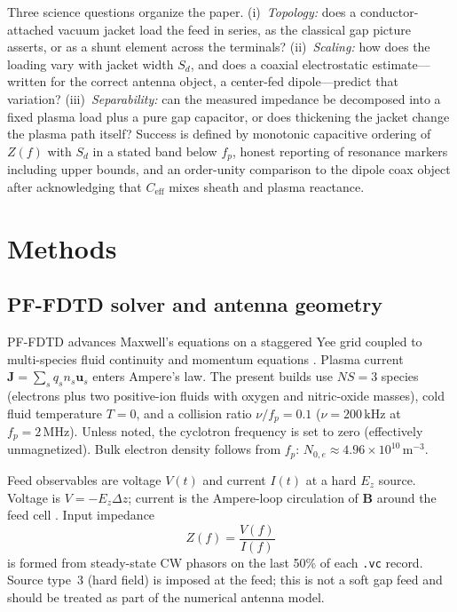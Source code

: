 \documentclass[draft]{agujournal2025}
\begin{document}
Three science questions organize the paper. (i)~\emph{Topology:} does a conductor-attached vacuum jacket load the feed in series, as the classical gap picture asserts, or as a shunt element across the terminals? (ii)~\emph{Scaling:} how does the loading vary with jacket width \(S_d\), and does a coaxial electrostatic estimate---written for the correct antenna object, a center-fed dipole---predict that variation? (iii)~\emph{Separability:} can the measured impedance be decomposed into a fixed plasma load plus a pure gap capacitor, or does thickening the jacket change the plasma path itself? Success is defined by monotonic capacitive ordering of \(Z(f)\) with \(S_d\) in a stated band below \(f_p\), honest reporting of resonance markers including upper bounds, and an order-unity comparison to the dipole coax object after acknowledging that \(C_\mathrm{eff}\) mixes sheath and plasma reactance.

\section{Methods}

\subsection{PF-FDTD solver and antenna geometry}

PF-FDTD advances Maxwell's equations on a staggered Yee grid coupled to multi-species fluid continuity and momentum equations \cite{ward2006}. Plasma current \(\mathbf{J}=\sum_s q_s n_s\mathbf{u}_s\) enters Ampere's law. The present builds use \(NS=3\) species (electrons plus two positive-ion fluids with oxygen and nitric-oxide masses), cold fluid temperature \(T=0\), and a collision ratio \(\nu/f_p=0.1\) (\(\nu=200\,\mathrm{kHz}\) at \(f_p=2\,\mathrm{MHz}\)). Unless noted, the cyclotron frequency is set to zero (effectively unmagnetized). Bulk electron density follows from \(f_p\): \(N_{0,e}\approx 4.96\times 10^{10}\,\mathrm{m}^{-3}\).

Feed observables are voltage \(V(t)\) and current \(I(t)\) at a hard \(E_z\) source. Voltage is \(V=-E_z\Delta z\); current is the Ampere-loop circulation of \(\mathbf{B}\) around the feed cell \cite{ward2006}. Input impedance
\begin{equation}
Z(f)=\frac{V(f)}{I(f)}
\end{equation}
is formed from steady-state CW phasors on the last 50\% of each \texttt{.vc} record. Source type~3 (hard field) is imposed at the feed; this is not a soft gap feed and should be treated as part of the numerical antenna model.
\end{document}
